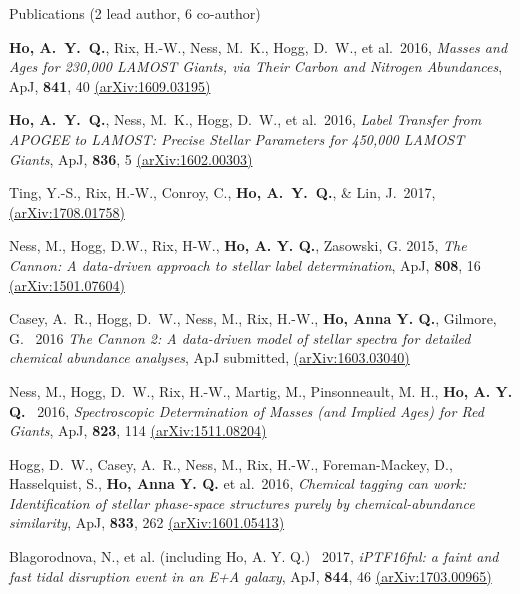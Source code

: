 \documentclass{resume} %
\begin{document}

\begin{rSection}{Publications (2 lead author, 6 co-author)}

\textbf{Ho, A.~Y.~Q.}, Rix, H.-W., Ness, M.~K., Hogg, D.~W., et al.\ 2016, 
\emph{Masses and Ages for 230,000 LAMOST Giants,
via Their Carbon and Nitrogen Abundances},
ApJ, \textbf{841}, 40
\href{http://arxiv.org/abs/1609.03195}{(arXiv:1609.03195)}

\textbf{Ho, A.~Y.~Q.}, Ness, M.~K., Hogg, D.~W., et al.\ 2016, 
\emph{Label Transfer from APOGEE to LAMOST: Precise Stellar Parameters for 
450,000 LAMOST Giants}, ApJ,
\textbf{836}, 5
\href{http://arxiv.org/abs/1602.00303}{(arXiv:1602.00303)}

Ting, Y.-S., Rix, H.-W., Conroy, C., \textbf{Ho, A.~Y.~Q.}, \& Lin, J.\ 2017, \href{https://arxiv.org/abs/1708.01758}{(arXiv:1708.01758)}

Ness, M., Hogg, D.W., Rix, H-W., \textbf{Ho, A. Y. Q.}, Zasowski, G. 2015,
\emph{The Cannon: A data-driven approach to stellar label determination}, ApJ,
\textbf{808}, 16 \href{http://arxiv.org/abs/1501.07604}{(arXiv:1501.07604)}

Casey, A.~R., Hogg, D.~W., Ness, M., Rix, H.-W., 
\textbf{Ho, Anna Y. Q.}, Gilmore, G. \ 2016
\emph{The Cannon 2: 
A data-driven model of stellar spectra for detailed 
chemical abundance analyses},
ApJ submitted,
\href{http://arxiv.org/abs/1603.03040}{(arXiv:1603.03040)}

Ness, M., Hogg, D.~W., Rix, H.-W., Martig, M., Pinsonneault, M. H.,
\textbf{Ho, A. Y. Q.} \ 2016, 
\emph{Spectroscopic Determination of Masses (and Implied Ages) for Red Giants},
ApJ, \textbf{823}, 114 \href{http://arxiv.org/abs/1511.08204}
{(arXiv:1511.08204)}

Hogg, D.~W., Casey, A.~R., Ness, M., Rix, H.-W., Foreman-Mackey, D., 
Hasselquist, S., \textbf{Ho, Anna Y. Q.} et al.\ 2016,
\emph{Chemical tagging can work: Identification of stellar 
phase-space structures purely by chemical-abundance similarity},
ApJ, \textbf{833}, 262
\href{http://arxiv.org/abs/1601.05413}{(arXiv:1601.05413)}

Blagorodnova, N., et al. (including {Ho, A. Y. Q.}) \ 2017,
\emph{iPTF16fnl: a faint and fast tidal disruption event in an E+A galaxy},
ApJ, \textbf{844}, 46
\href{https://arxiv.org/abs/1703.00965}{(arXiv:1703.00965)}

\end{rSection}

\end{document}

